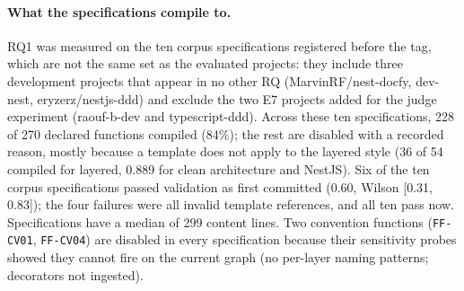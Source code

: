 \documentclass[10pt,a4paper]{article}
\newcommand{\ff}[1]{\texttt{\small #1}}
\begin{document}
\paragraph{What the specifications compile to.}
RQ1 was measured on the ten corpus specifications registered before the tag, which are not the same set as the
evaluated projects: they include three development projects that appear in no other RQ (MarvinRF/nest-docfy,
dev-nest, eryzerz/nestjs-ddd) and exclude the two E7 projects added for the judge experiment (raouf-b-dev and
typescript-ddd). %
Across these ten specifications, 228 of 270 declared functions compiled (84\%); the rest are
disabled with a recorded reason, mostly because a template does not apply to the layered style (36 of 54 compiled
for layered, 0.889 for clean architecture and NestJS). %
Six of the ten corpus specifications passed validation as first committed (0.60, Wilson [0.31, 0.83]); the four
failures were all invalid template references, and all ten pass now. Specifications have a median of 299 content
lines. %
Two convention functions (\ff{FF-CV01}, \ff{FF-CV04}) are disabled in every specification because their sensitivity
probes showed they cannot fire on the current graph (no per-layer naming patterns; decorators not ingested).
\end{document}
